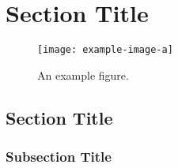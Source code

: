 \chapter{Section Title}
\lipsum[1-3]
\begin{figure}
    \centering
    \texttt{[image: example-image-a]}
    \caption{An example figure.}
    \label{fig:example-a}
\end{figure}

\section{Section Title}
\lipsum[4-5]

\subsection{Subsection Title}
\lipsum[6]
